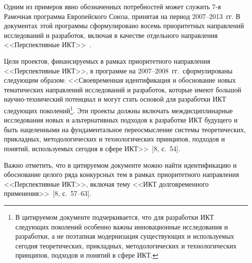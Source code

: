 \begin{multicols}{2}
      Одним из примеров явно обозначенных потребностей может служить 7-я Рамочная
программа Европейского Союза, принятая на период 2007--2013~гг. В документах этой
программы сформулировано восемь приоритетных направлений исследований и разработок,
включая в качестве отдельного направления <<Перспективные ИКТ>>~\cite{2za, 7za}.

      Цели проектов, финансируемых в рамках приоритетного направления <<Перспективные
ИКТ>>, в программе на 2007--2008~гг.\ сформулированы следующим образом:
<<Своевременная идентификация и обоснование новых тематических направлений
исследований и разработок, которые имеют большой научно-технический потенциал и могут
стать основой для разработки ИКТ следующих поколений\footnote{В цитируемом документе
подчеркивается, что для разработки ИКТ следующих поколений особенно важны инновационные
исследования и разработки, а не поэтапная модернизация существующих и используемых сегодня
теоретических, прикладных, методологических и технологических принципов, подходов и понятий в
сфере ИКТ.}. Эти проекты должны включать меж\-дис\-цип\-ли\-нар\-ные исследования новых и
альтернативных подходов к разработке ИКТ будущего и быть нацеленными на
фундаментальное переосмысление системы теоретических, прикладных, методологических и
технологических принципов, подходов и понятий, используемых сегодня в сфере
ИКТ>>~[8, с.~54].

      Важно отметить, что в цитируемом документе можно найти идентификацию и
обоснование целого ряда конкурсных тем в рамках приоритетного направления
<<Перспективные ИКТ>>, включая тему <<ИКТ долговременного 
применения>>~[8, с.~57--63].


\end{multicols}
